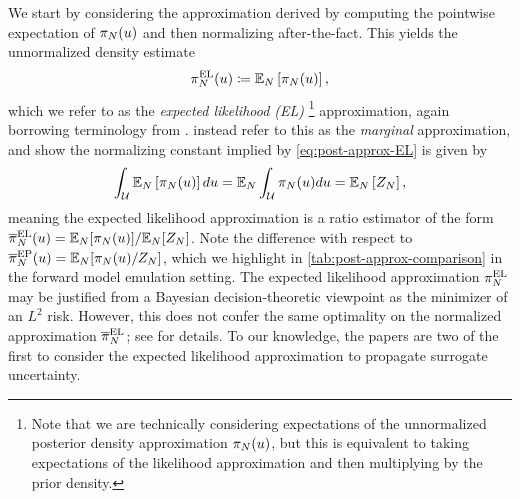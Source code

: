 \documentclass[12pt]{article}
\begin{document}
We start by considering the approximation derived by computing the pointwise expectation 
of $\postEm(\Par)$ and then normalizing after-the-fact.
This yields the unnormalized density estimate
\begin{align}
\postApproxMarg[\Ndesign](\Par) \Def \E_{\Ndesign}\left[\postEm[\Ndesign](\Par) \right], \label{eq:post-approx-EL}
\end{align}
which we refer to as the \textit{expected likelihood (EL)}
\footnote{Note that we are technically considering expectations of the unnormalized posterior density approximation 
$\postEm[\Ndesign](\Par)$, but this is equivalent to taking expectations of the likelihood approximation and
then multiplying by the prior density.}
approximation, again borrowing terminology from
 \citet{BurknerSurrogate}. \citet{StuartTeck1} instead refer to this as the \textit{marginal} approximation, 
 and show the normalizing constant implied by \cref{eq:post-approx-EL} is given by
 \begin{equation}
 \int_{\parSpace} \E_{\Ndesign}\left[\postEm[\Ndesign](\Par) \right] d\Par 
 = \E_{\Ndesign} \int_{\parSpace} \postEm[\Ndesign](\Par) d\Par
 = \E_{\Ndesign}\left[\normCstEm \right],
 \end{equation} 
meaning the expected likelihood approximation is a ratio estimator of the form 
 $\postApproxNormMarg[\Ndesign](\Par) = \E_{\Ndesign}[\postEm[\Ndesign](\Par)] / \E_{\Ndesign}[\normCstEm]$.
 Note the difference with respect to 
 $\postApproxEP[\Ndesign](\Par) = \E_{\Ndesign}[\postEm[\Ndesign](\Par) / \normCstEm]$, 
 which we highlight in \cref{tab:post-approx-comparison} in the forward model emulation setting.  
 The expected likelihood approximation $\postApproxMarg[\Ndesign]$ may be justified from a Bayesian
 decision-theoretic viewpoint as the minimizer of an $L^2$ risk. However, this does not 
 confer the same optimality on the normalized approximation $\postApproxNormMarg[\Ndesign]$;
 see \citep{SinsbeckNowak,StuartTeck2,VehtariParallelGP} for details. To our knowledge, the papers
 \citep{SinsbeckNowak,StuartTeck1} are two of the first to consider the expected likelihood approximation
 to propagate surrogate uncertainty.
 
\end{document}
